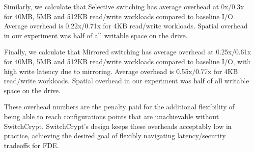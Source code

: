 Similarly, we calculate that Selective switching has average overhead at 0x/0.3x
for 40MB, 5MB and 512KB read/write workloads compared to baseline I/O. Average
overhead is 0.22x/0.71x for 4KB read/write workloads. Spatial overhead in our
experiment was half of all writable space on the drive.

Finally, we calculate that Mirrored switching has average overhead at
0.25x/0.61x for 40MB, 5MB and 512KB read/write workloads compared to baseline
I/O, with high write latency due to mirroring. Average overhead is 0.55x/0.77x
for 4KB read/write workloads. Spatial overhead in our experiment was half of all
writable space on the drive.

These overhead numbers are the penalty paid for the additional flexibility of
being able to reach configurations points that are unachievable without
SwitchCrypt. SwitchCrypt's design keeps these overheads acceptably low in
practice, achieving the desired goal of flexibly navigating latency/security
tradeoffs for FDE.

